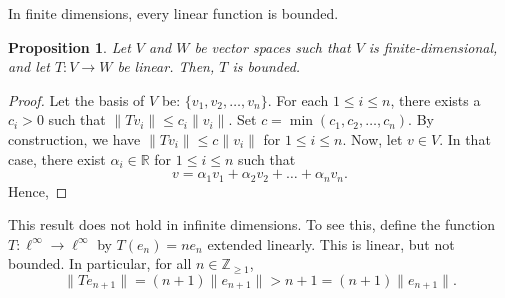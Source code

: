 \documentclass[a4paper, openany]{memoir}
\theoremstyle{definition}
\theoremstyle{plain}
\newtheorem{proposition}[definition]{Proposition}
\begin{document}
    In finite dimensions, every linear function is bounded.
    \begin{proposition}
        Let $V$ and $W$ be vector spaces such that $V$ is finite-dimensional, and let $T \colon V \to W$ be linear. Then, $T$ is bounded.
    \end{proposition}
    \begin{proof}
        Let the basis of $V$ be: $\{v_1, v_2, \dots, v_n\}$. For each $1 \leq i \leq n$, there exists a $c_i > 0$ such that $\lVert Tv_i \rVert \leq c_i \lVert v_i \rVert$. Set $c = \min(c_1, c_2, \dots, c_n)$. By construction, we have $\lVert Tv_i \rVert \leq c \lVert v_i \rVert$ for $1 \leq i \leq n$. Now, let $v \in V$. In that case, there exist $\alpha_i \in \mathbb{R}$ for $1 \leq i \leq n$ such that 
        \[v = \alpha_1 v_1 + \alpha_2 v_2 + \dots + \alpha_n v_n.\]
        Hence,
    \end{proof}

    This result does not hold in infinite dimensions. To see this, define the function $T \colon \ell^\infty \to \ell^\infty$ by $T(e_n) = ne_n$ extended linearly. This is linear, but not bounded. In particular, for all $n \in \mathbb{Z}_{\geq 1}$,
    \[\lVert Te_{n+1} \rVert = (n+1) \lVert e_{n+1} \rVert > n+1 = (n + 1) \lVert e_{n+1} \rVert.\]
\end{document}
